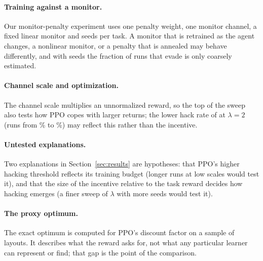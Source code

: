 \paragraph{Training against a monitor.} Our monitor-penalty experiment uses one
penalty weight, one monitor channel, a fixed linear monitor and
 seeds per task. A monitor that is retrained as the agent
changes, a nonlinear monitor, or a penalty that is annealed may behave
differently, and with  seeds the fraction of runs that evade is
only coarsely estimated.

\paragraph{Channel scale and optimization.} The channel scale multiplies an
unnormalized reward, so the top of the sweep also tests how PPO copes with
larger returns; the lower hack rate of \ST{} at $\lambda=2$ (runs from
\% to \%)
may reflect this rather than the incentive.

\paragraph{Untested explanations.} Two explanations in Section~\ref{sec:results}
are hypotheses: that PPO's higher hacking threshold reflects its training budget
(longer runs at low scales would test it), and that the size of the incentive
relative to the task reward decides how hacking emerges (a finer sweep of
$\lambda$ with more seeds would test it).

\paragraph{The proxy optimum.} The exact optimum is computed for PPO's discount
factor on a sample of layouts. It describes what the reward asks for, not what
any particular learner can represent or find; that gap is the point of the
comparison.
